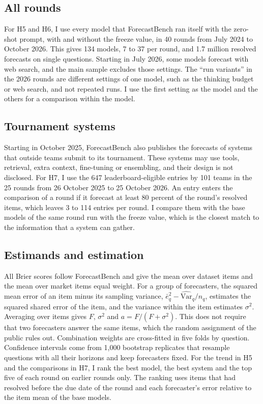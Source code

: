 \documentclass[11pt,a4paper]{article}
\theoremstyle{definition}
\begin{document}
\subsection{All rounds}

For H5 and H6, I use every model that ForecastBench ran itself with the zero-shot prompt, with and without the freeze value, in 40 rounds from July 2024 to October 2026. This gives 134 models, 7 to 37 per round, and 1.7 million resolved forecasts on single questions. Starting in July 2026, some models forecast with web search, and the main sample excludes those settings. The ``run variants'' in the 2026 rounds are different settings of one model, such as the thinking budget or web search, and not repeated runs. I use the first setting as the model and the others for a comparison within the model.

\subsection{Tournament systems}

Starting in October 2025, ForecastBench also publishes the forecasts of systems that outside teams submit to its tournament. These systems may use tools, retrieval, extra context, fine-tuning or ensembling, and their design is not disclosed. For H7, I use the 647 leaderboard-eligible entries by 101 teams in the 25 rounds from 26 October 2025 to 25 October 2026. An entry enters the comparison of a round if it forecast at least 80 percent of the round's resolved items, which leaves 3 to 114 entries per round. I compare them with the base models of the same round run with the freeze value, which is the closest match to the information that a system can gather.

\subsection{Estimands and estimation}

All Brier scores follow ForecastBench and give the mean over dataset items and the mean over market items equal weight. For a group of forecasters, the squared mean error of an item minus its sampling variance, $\bar e_q^2-\widehat{\mathrm{Var}}_q/n_q$, estimates the squared shared error of the item, and the variance within the item estimates $\sigma^2$. Averaging over items gives $F$, $\sigma^2$ and $a=F/(F+\sigma^2)$. This does not require that two forecasters answer the same items, which the random assignment of the public rules out. Combination weights are cross-fitted in five folds by question. Confidence intervals come from 1,000 bootstrap replicates that resample questions with all their horizons and keep forecasters fixed. For the trend in H5 and the comparisons in H7, I rank the best model, the best system and the top five of each round on earlier rounds only. The ranking uses items that had resolved before the due date of the round and each forecaster's error relative to the item mean of the base models.
\end{document}
